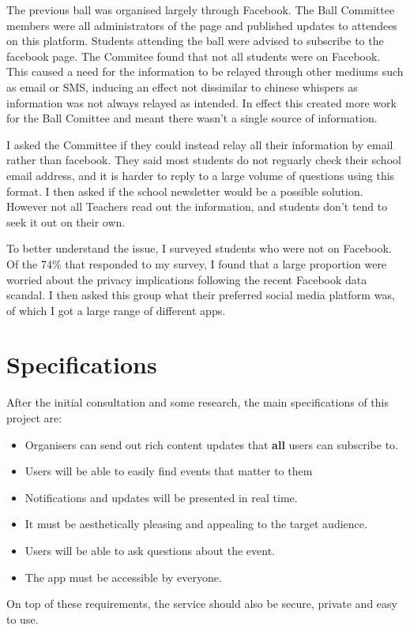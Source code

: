 \documentclass[a4paper,oneside,12pt,draft]{report}
\begin{document}
	The previous ball was organised largely through Facebook. The Ball Committee members were all administrators of the page and published updates to attendees on this platform. Students attending the ball were advised to subscribe to the facebook page. The Commitee found that not all students were on Facebook. This caused a need for the information to be relayed through other mediums such as email or SMS, inducing an effect not dissimilar to chinese whispers as information was not always relayed as intended. In effect this created more work for the Ball Comittee and meant there wasn't a single source of information.

	I asked the Committee if they could instead relay all their information by email rather than facebook. They said most students do not reguarly check their school email address, and it is harder to reply to a large volume of questions using this format. I then asked if the school newsletter would be a possible solution. However not all Teachers read out the information, and students don't tend to seek it out on their own.

	To better understand the issue, I surveyed students who were not on Facebook. Of the 74\% that responded to my survey, I found that a large proportion were worried about the privacy implications following the recent Facebook data scandal. I then asked this group what their preferred social media platform was, of which I got a large range of different apps.

	\section{Specifications}
	After the initial consultation and some research, the main specifications of this project are:
	\begin{itemize}
		\item Organisers can send out rich content updates that \textbf{all} users can subscribe to.
		\item Users will be able to easily find events that matter to them
		\item Notifications and updates will be presented in real time.
		\item It must be aesthetically pleasing and appealing to the target audience.
		\item Users will be able to ask questions about the event.
		\item The app must be accessible by everyone.
	\end{itemize}
	On top of these requirements, the service should also be secure, private and easy to use.
\end{document}
